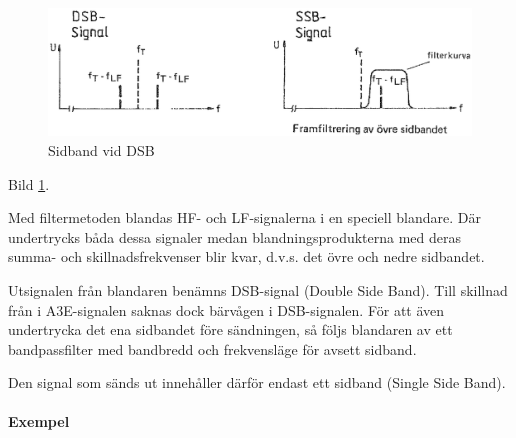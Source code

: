 \begin{figure}
\includegraphics[width=\textwidth]{images/cropped_pdfs/bild_2_1-27.pdf}
\caption{Sidband vid DSB}
\label{fig:BildII1-27}
\end{figure}

Bild \ref{fig:BildII1-27}.

Med filtermetoden blandas HF- och LF-signalerna i en speciell blandare. Där
undertrycks båda dessa signaler medan blandningsprodukterna med deras summa-
och skillnadsfrekvenser blir kvar, d.v.s. det övre och nedre sidbandet.

Utsignalen från blandaren benämns DSB-signal (Double Side Band). Till skillnad
från i A3E-signalen saknas dock bärvågen i DSB-signalen. För att även
undertrycka det ena sidbandet före sändningen, så följs blandaren av ett
bandpassfilter med bandbredd och frekvensläge för avsett sidband.

Den signal som sänds ut innehåller därför endast ett sidband (Single Side Band).

\paragraph{Exempel}

